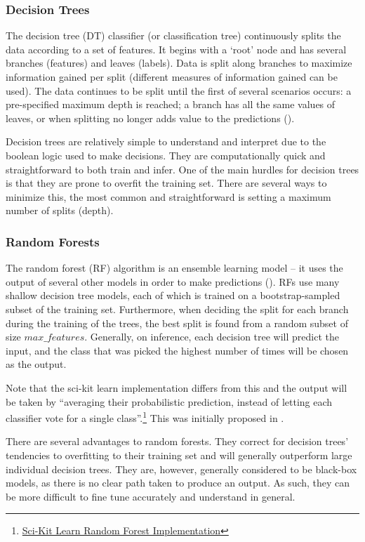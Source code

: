 \documentclass[a4paper, 11pt]{article}
\begin{document}
\begin{multicols}{2}
\subsubsection{Decision Trees}
The decision tree (DT) classifier (or classification tree) continuously splits the data according to a set of features. It begins with a ‘root’ node and has several branches (features) and leaves (labels). Data is split along branches to maximize information gained per split (different measures of information gained can be used). The data continues to be split until the first of several scenarios occurs: a pre-specified maximum depth is reached; a branch has all the same values of leaves, or when splitting no longer adds value to the predictions (\cite{morgan1963problems}).

Decision trees are relatively simple to understand and interpret due to the boolean logic used to make decisions. They are computationally quick and straightforward to both train and infer. One of the main hurdles for decision trees is that they are prone to overfit the training set. There are several ways to minimize this, the most common and straightforward is setting a maximum number of splits (depth).

\subsubsection{Random Forests}
The random forest (RF) algorithm is an ensemble learning model – it uses the output of several other models in order to make predictions (\cite{ho1995random}). RFs use many shallow decision tree models, each of which is trained on a bootstrap-sampled subset of the training set. Furthermore, when deciding the split for each branch during the training of the trees, the best split is found from a random subset of size
\(max\_features\). Generally, on inference, each decision tree will predict the input, and the class that was picked the highest number of times will be chosen as the output.

Note that the sci-kit learn implementation differs from this and the output will be taken by “averaging their probabilistic prediction, instead of letting each classifier vote for a single class”.\footnote{\href{https://scikit-learn.org/stable/modules/generated/sklearn.ensemble.RandomForestClassifier.html}{Sci-Kit Learn Random Forest Implementation}\label{sklearn:rf}} This was initially proposed in \citet{Breiman1996}.

There are several advantages to random forests. They correct for decision trees' tendencies to overfitting to their training set and will generally outperform large individual decision trees. They are, however, generally considered to be black-box models, as there is no clear path taken to produce an output. As such, they can be more difficult to fine tune accurately and understand in general.



\end{multicols}
\end{document}
